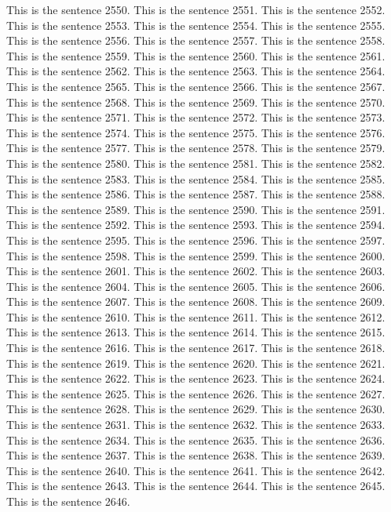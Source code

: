 \documentclass{article}
\begin{document}
This is the sentence 2550.
This is the sentence 2551.
This is the sentence 2552.
This is the sentence 2553.
This is the sentence 2554.
This is the sentence 2555.
This is the sentence 2556.
This is the sentence 2557.
This is the sentence 2558.
This is the sentence 2559.
This is the sentence 2560.
This is the sentence 2561.
This is the sentence 2562.
This is the sentence 2563.
This is the sentence 2564.
This is the sentence 2565.
This is the sentence 2566.
This is the sentence 2567.
This is the sentence 2568.
This is the sentence 2569.
This is the sentence 2570.
This is the sentence 2571.
This is the sentence 2572.
This is the sentence 2573.
This is the sentence 2574.
This is the sentence 2575.
This is the sentence 2576.
This is the sentence 2577.
This is the sentence 2578.
This is the sentence 2579.
This is the sentence 2580.
This is the sentence 2581.
This is the sentence 2582.
This is the sentence 2583.
This is the sentence 2584.
This is the sentence 2585.
This is the sentence 2586.
This is the sentence 2587.
This is the sentence 2588.
This is the sentence 2589.
This is the sentence 2590.
This is the sentence 2591.
This is the sentence 2592.
This is the sentence 2593.
This is the sentence 2594.
This is the sentence 2595.
This is the sentence 2596.
This is the sentence 2597.
This is the sentence 2598.
This is the sentence 2599.
This is the sentence 2600.
This is the sentence 2601.
This is the sentence 2602.
This is the sentence 2603.
This is the sentence 2604.
This is the sentence 2605.
This is the sentence 2606.
This is the sentence 2607.
This is the sentence 2608.
This is the sentence 2609.
This is the sentence 2610.
This is the sentence 2611.
This is the sentence 2612.
This is the sentence 2613.
This is the sentence 2614.
This is the sentence 2615.
This is the sentence 2616.
This is the sentence 2617.
This is the sentence 2618.
This is the sentence 2619.
This is the sentence 2620.
This is the sentence 2621.
This is the sentence 2622.
This is the sentence 2623.
This is the sentence 2624.
This is the sentence 2625.
This is the sentence 2626.
This is the sentence 2627.
This is the sentence 2628.
This is the sentence 2629.
This is the sentence 2630.
This is the sentence 2631.
This is the sentence 2632.
This is the sentence 2633.
This is the sentence 2634.
This is the sentence 2635.
This is the sentence 2636.
This is the sentence 2637.
This is the sentence 2638.
This is the sentence 2639.
This is the sentence 2640.
This is the sentence 2641.
This is the sentence 2642.
This is the sentence 2643.
This is the sentence 2644.
This is the sentence 2645.
This is the sentence 2646.
\end{document}
